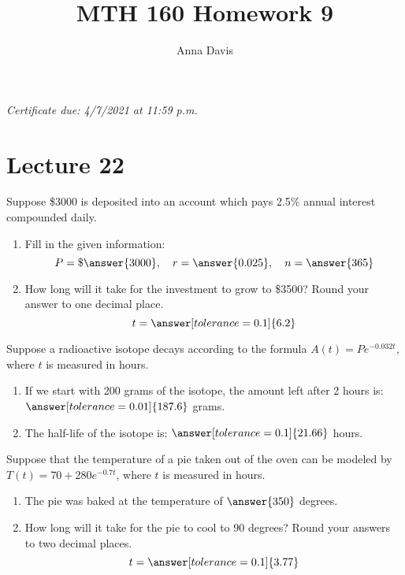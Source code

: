 \documentclass{ximera}
\author{Anna Davis} \title{MTH 160 Homework 9}
\begin{document}
\begin{abstract}

\end{abstract}
\maketitle
 \textit{Certificate due: 4/7/2021 at 11:59 p.m.}
 \section{Lecture 22}
 
  \begin{problem}\label{prob:160hom9prob1} 
Suppose \$3000 is deposited into an account which pays 2.5\% annual interest compounded daily.  
 \begin{enumerate}
 \item Fill in the given information:
 $$P=\$\answer{3000},\quad r=\answer{0.025},\quad n=\answer{365}$$
 \item How long will it take for the investment to grow to \$3500?
 Round your answer to one decimal place.
 $$t=\answer[tolerance=0.1]{6.2}$$
 \end{enumerate}
 \end{problem}
 
 \begin{problem}\label{prob:160hom9prob2} 
 Suppose a radioactive isotope decays according to the formula $A(t)=Pe^{-0.032t}$, where $t$ is measured in hours.  
 \begin{enumerate}
     \item 
If we start with 200 grams of the isotope, the amount left after 2 hours is: $\answer[tolerance=0.01]{187.6}$ grams.
\item The half-life of the isotope is: $\answer[tolerance=0.1]{21.66}$ hours.
\end{enumerate}
\end{problem}

\begin{problem}\label{prob:160hom9prob3}
 Suppose that the temperature of a pie taken out of the oven can be modeled by $T(t)=70+280e^{-0.7t}$, where $t$ is measured in hours.
 \begin{enumerate}
     \item The pie was baked at the temperature of $\answer{350}$ degrees.
     \item How long will it take for the pie to cool to 90 degrees?  Round your answers to two decimal places.
     $$t=\answer[tolerance=0.1]{3.77}$$
 \end{enumerate}
 \end{problem}
 
 
\end{document}
